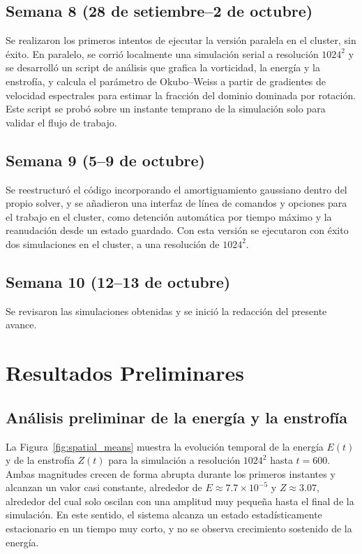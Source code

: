 \subsection*{Semana 8 (28 de setiembre--2 de octubre)}
Se realizaron los primeros intentos de ejecutar la 
versión paralela en el cluster, sin éxito. 
En paralelo, se corrió localmente una simulación 
serial a resolución $1024^2$ y se desarrolló un script
de análisis que grafica la vorticidad, la energía y la enstrofía,
y calcula el parámetro de Okubo--Weiss a partir de gradientes de 
velocidad espectrales para estimar la fracción del dominio dominada 
por rotación. Este script se probó sobre un instante temprano de la 
simulación solo para validar el flujo de trabajo.

\subsection*{Semana 9 (5--9 de octubre)}
Se reestructuró el código incorporando el amortiguamiento 
gaussiano dentro del propio solver, y se añadieron una 
interfaz de línea de comandos y opciones para el trabajo 
en el cluster, como detención automática por tiempo máximo 
y la reanudación desde un estado guardado. Con esta versión 
se ejecutaron con éxito dos simulaciones en el cluster, 
a una resolución de $1024^2$.

\subsection*{Semana 10 (12--13 de octubre)}
Se revisaron las simulaciones obtenidas y 
se inició la redacción del presente avance.

\section{Resultados Preliminares}

\subsection*{Análisis preliminar de la energía y la enstrofía}

La Figura~\ref{fig:spatial_means} muestra la 
evolución temporal de la energía $E(t)$ y de 
la enstrofía $Z(t)$ para la simulación a resolución
$1024^2$ hasta $t=600$. Ambas magnitudes crecen de 
forma abrupta durante los primeros instantes y 
alcanzan un valor casi constante, alrededor de
$E\approx7.7\times10^{-5}$ y $Z\approx3.07$, 
alrededor del cual solo oscilan con una amplitud
muy pequeña hasta el final de la simulación. 
En este sentido, el sistema alcanza un estado
estadísticamente estacionario en un tiempo muy 
corto, y no se observa crecimiento sostenido de la energía.

